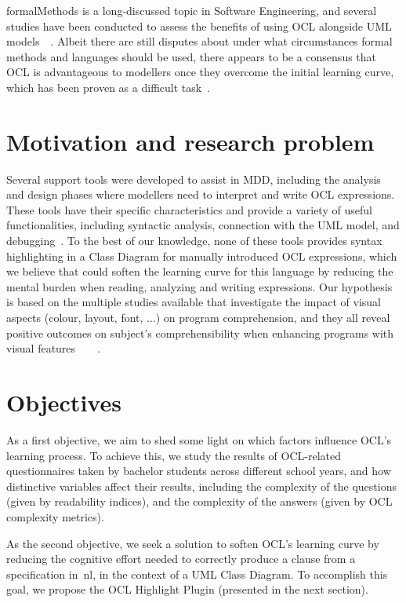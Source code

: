 \gls{formalMethods} is a long-discussed topic in Software Engineering, and several studies have been conducted to assess the benefits of using OCL alongside UML models~\cite{Briand2004}~\cite{Briand2005}. Albeit there are still disputes about under what circumstances formal methods and languages should be used, there appears to be a consensus that OCL is advantageous to modellers once they overcome the initial learning curve, which has been proven as a difficult task~\cite{Zamansky2016}.

\section{Motivation and research problem}
\label{sec:Introduction-Motivation}

Several support tools were developed to assist in MDD, including the analysis and design phases where modellers need to interpret and write OCL expressions. These tools have their specific characteristics and provide a variety of useful functionalities, including syntactic analysis, connection with the UML model, and debugging~\cite{Toval2003}. To the best of our knowledge, none of these tools provides syntax highlighting in a Class Diagram for manually introduced OCL expressions, which we believe that could soften the learning curve for this language by reducing the mental burden when reading, analyzing and writing expressions. Our hypothesis is based on the multiple studies available that investigate the impact of visual aspects (colour, layout, font, ...) on program comprehension, and they all reveal positive outcomes on subject's comprehensibility when enhancing programs with visual features~\cite{Rambally1986}~\cite{Yusuf2007}~\cite{Mehta2009}~\cite{Sarkar2015}.

\section{Objectives}
\label{sec:Introduction-Objectives}

As a first objective, we aim to shed some light on which factors influence OCL's learning process. To achieve this, we study the results of OCL-related questionnaires taken by bachelor students across different school years, and how distinctive variables affect their results, including the complexity of the questions (given by readability indices), and the complexity of the answers (given by OCL complexity metrics). 

As the second objective, we seek a solution to soften OCL's learning curve by reducing the cognitive effort needed to correctly produce a clause from a specification in~\gls{nl}, in the context of a UML Class Diagram. To accomplish this goal, we propose the OCL Highlight Plugin (presented in the next section).

